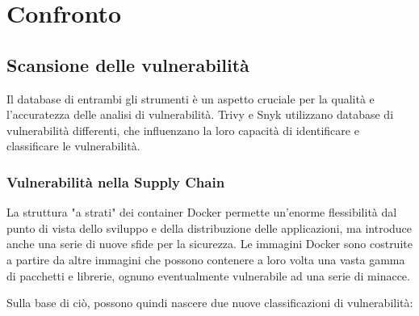 \chapter{Confronto}
\section{Scansione delle vulnerabilità}
Il database di entrambi gli strumenti è un aspetto cruciale per la qualità e l'accuratezza delle analisi di vulnerabilità. Trivy e Snyk utilizzano database di vulnerabilità differenti, che influenzano la loro capacità di identificare e classificare le vulnerabilità.
\subsection{Vulnerabilità nella Supply Chain}
La struttura "a strati" dei container Docker permette un'enorme flessibilità dal punto di vista dello sviluppo e della distribuzione delle applicazioni, ma introduce anche una serie di nuove sfide per la sicurezza. Le immagini Docker sono costruite a partire da altre immagini che possono contenere a loro volta una vasta gamma di pacchetti e librerie, ognuno eventualmente vulnerabile ad una serie di minacce.

Sulla base di ciò, possono quindi nascere due nuove classificazioni di vulnerabilità:

